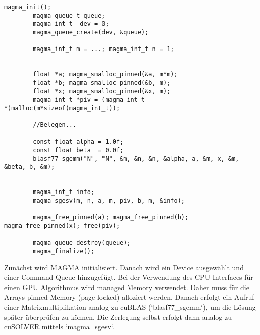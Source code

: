 		\begin{lstlisting}[caption=MAGMA: CPU-Interface]
		magma_init();
		magma_queue_t queue;
		magma_int_t  dev = 0;
		magma_queue_create(dev, &queue);
  
		magma_int_t m = ...; magma_int_t n = 1;
                      
                      
		float *a; magma_smalloc_pinned(&a, m*m);   
		float *b; magma_smalloc_pinned(&b, m);  
		float *x; magma_smalloc_pinned(&x, m);   
		magma_int_t *piv = (magma_int_t *)malloc(m*sizeof(magma_int_t));
		
		//Belegen...

		const float alpha = 1.0f;
		const float beta  = 0.0f;
		blasf77_sgemm("N", "N", &m, &n, &n, &alpha, a, &m, x, &m, &beta, b, &m);


		magma_int_t info;
		magma_sgesv(m, n, a, m, piv, b, m, &info);

		magma_free_pinned(a); magma_free_pinned(b); magma_free_pinned(x); free(piv);

		magma_queue_destroy(queue);
		magma_finalize();
		\end{lstlisting}
		
		Zunächst wird MAGMA initialisiert. Danach wird ein Device ausgewählt und einer Command Queue hinzugefügt. Bei der Verwendung des CPU Interfaces für einen GPU Algorithmus wird managed Memory verwendet. Daher muss für die Arrays pinned Memory (page-locked) alloziert werden. Danach erfolgt ein Aufruf einer Matrixmultiplikation analog zu cuBLAS \mbox{(\li`blasf77_sgemm`)}, um die Lösung später überprüfen zu können. Die Zerlegung selbst erfolgt dann analog zu cuSOLVER mittels \li`magma_sgesv`.	
		
